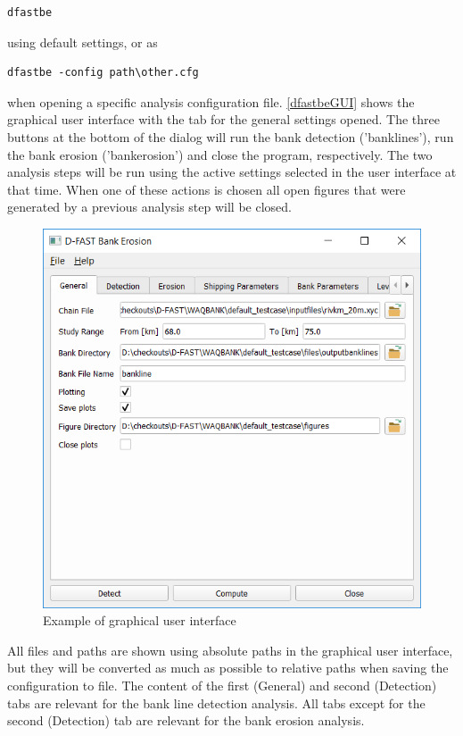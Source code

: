 \begin{Verbatim}
dfastbe
\end{Verbatim}

using default settings, or as

\begin{Verbatim}
dfastbe -config path\other.cfg
\end{Verbatim}

when opening a specific analysis configuration file.
\autoref{dfastbeGUI} shows the graphical user interface with the tab for the general settings opened.
The three buttons at the bottom of the dialog will run the bank detection ('banklines'), run the bank erosion ('bankerosion') and close the program, respectively.
The two analysis steps will be run using the active settings selected in the user interface at that time.
When one of these actions is chosen all open figures that were generated by a previous analysis step will be closed.

\begin{figure}
\center
\includegraphics[width=12cm]{figures/gui1.png}
\caption{Example of \dfastbe graphical user interface}
\label{dfastbeGUI}
\end{figure}

All files and paths are shown using absolute paths in the graphical user interface, but they will be converted as much as possible to relative paths when saving the configuration to file.
The content of the first (General) and second (Detection) tabs are relevant for the bank line detection analysis.
All tabs except for the second (Detection) tab are relevant for the bank erosion analysis.

